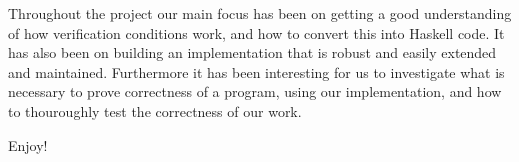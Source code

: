 Throughout the project our main focus has been on getting a good understanding of how verification conditions work, and how to convert this into Haskell code. It has also been on building an implementation that is robust and easily extended and maintained.
Furthermore it has been interesting for us to investigate what is necessary to prove correctness of a program, using our implementation, and how to thouroughly test the correctness of our work.

Enjoy!
